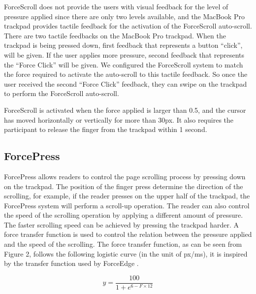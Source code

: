 \documentclass{sigchi}
\begin{document}
ForceScroll does not provide the users with visual feedback for the level of pressure applied since there are only two levels available, and the MacBook Pro trackpad provides tactile feedback for the activation of the ForceScroll auto-scroll. There are two tactile feedbacks on the MacBook Pro trackpad. When the trackpad is being pressed down, first feedback that represents a button ``click'', will be given. If the user applies more pressure, second feedback that represents the ``Force Click'' will be given. We configured the ForceScroll system to match the force required to activate the auto-scroll to this tactile feedback. So once the user received the second ``Force Click'' feedback, they can swipe on the trackpad to perform the ForceScroll auto-scroll. 


ForceScroll is activated when the force applied is larger than 0.5, and the cursor has moved horizontally or vertically for more than 30px. It also requires the participant to release the finger from the trackpad within 1 second.

\subsection{ForcePress}
ForcePress allows readers to control the page scrolling process by pressing down on the trackpad. The position of the finger press determine the direction of the scrolling, for example, if the reader presses on the upper half of the trackpad, the ForcePress system will perform a scroll-up operation. The reader can also control the speed of the scrolling operation by applying a different amount of pressure. The faster scrolling speed can be achieved by pressing the trackpad harder. A force transfer function is used to control the relation between the pressure applied and the speed of the scrolling. The force transfer function, as can be seen from Figure 2, follows the following logistic curve (in the unit of px/ms), it is inspired by the transfer function used by ForceEdge \cite{antoine2017forceedge}.

\[
    y = \frac{100}{1 + e^{6 - F \times 12}}
\]
\end{document}
